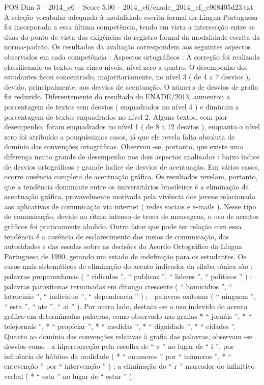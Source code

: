 \begin{textsample}{POS Dim 3 – 2014\_c6 – Score 5.00 – 2014\_c6/enade\_2014\_ef\_e968405d23.txt}
A seleção vocabular adequada à modalidade escrita formal da Língua Portuguesa foi incorporada a essa última competência, tendo em vista a intersecção entre as duas do ponto de vista das exigências do registro formal da modalidade escrita da norma-padrão.
Os resultados da avaliação correspondem aos seguintes aspectos observados em cada competência : Aspectos ortográficos : A correção foi realizada classificando os textos em cinco níveis, nível zero a quatro.
O desempenho dos estudantes ficou concentrado, majoritariamente, no nível 3 ( de 4 a 7 desvios ), devido, principalmente, aos desvios de acentuação.
O número de desvios de grafia foi reduzido.
Diferentemente do resultado do ENADE/2013, aumentou a porcentagem de textos sem desvios ( enquadrados no nível 4 ) e diminuiu a porcentagem de textos enquadrados no nível 2.
Alguns textos, com pior desempenho, foram enquadrados no nível 1 ( de 8 a 12 desvios ), enquanto o nível zero foi atribuído a pouquíssimos casos, já que ele revela falta absoluta de domínio das convenções ortográficas.
Observou -se, portanto, que existe uma diferença muito grande de desempenho nos dois aspectos analisados : baixo índice de desvios ortográficos e grande índice de desvios de acentuação.
Em vários casos, ocorre ausência completa de acentuação gráfica.
Os resultados revelam, portanto, que a tendência dominante entre os universitários brasileiros é a eliminação da acentuação gráfica, provavelmente motivada pela vivência dos jovens relacionada aos aplicativos de comunicação via internet ( redes sociais e e-mails ).
Nesse tipo de comunicação, devido ao ritmo intenso de troca de mensagens, o uso de acentos gráficos foi praticamente abolido.
Outro fator que pode ter relação com essa tendência é a ausência de esclarecimento dos meios de comunicação, das autoridades e das escolas sobre as decisões do Acordo Ortográfico da Língua Portuguesa de 1990, gerando um estado de indefinição para os estudantes.
Os casos mais sistemáticos de eliminação do acento indicador da sílaba tônica são :  palavras proparoxítonas ( “ ridiculos ”, “ publicas ”, “ lideres ”, “ politicos ” ) ;  palavras paroxítonas terminadas em ditongo crescente ( “ homicidios ”, “ latrocinio ”, “ individuo ”, “ dependencia ” ) ;  palavras oxítonas ( “ ninguem ”, “ esta ”, “ ate ”, “ ai ” ).
Por outro lado, destaca -se o uso indevido do acento gráfico em determinadas palavras, como observado nas grafias * “ jornáis ”, * “ telejornaís ”, * “ propíciar ”, * “ medídas ”, * “ dígnidade ”, * “ cídades ”.
Quanto ao domínio das convenções relativas à grafia das palavras, observam -se desvios como : a hipercorreção pela escolha de “ e ” no lugar de “ i ”, por influência de hábitos da oralidade ( * “ enumeros ” por “ inúmeros ”, * “ entevenção ” por “ intervenção ” ) ; a eliminação do “ r ” marcador do infinitivo verbal ( * “ esta ” no lugar de “ estar ” ).

\end{textsample}
